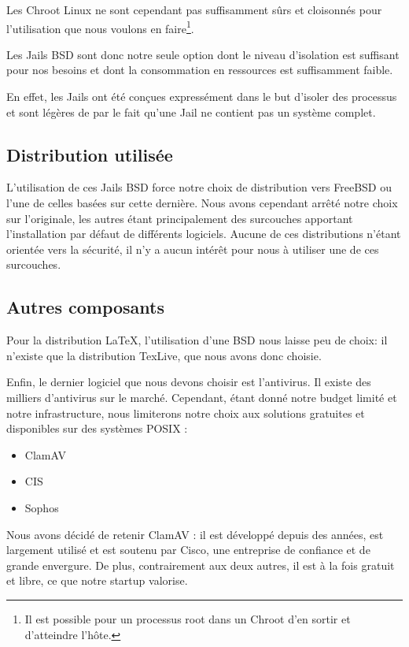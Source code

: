 \documentclass[10pt,a4paper]{article}
\begin{document}
Les Chroot Linux ne sont cependant pas suffisamment sûrs et cloisonnés pour l'utilisation que nous voulons en faire\footnote{Il est possible pour un processus root dans un Chroot d'en sortir et d'atteindre l'hôte.}.

Les Jails BSD sont donc notre seule option dont le niveau d'isolation est suffisant pour nos besoins et dont la consommation en ressources est suffisamment faible.

En effet, les Jails ont été conçues expressément dans le but d'isoler des processus et sont légères de par le fait qu'une Jail ne contient pas un système complet.

\subsection{Distribution utilisée}

L'utilisation de ces Jails BSD force notre choix de distribution vers FreeBSD ou l'une de celles basées sur cette dernière. Nous avons cependant arrêté notre choix sur l'originale, les autres étant principalement des surcouches apportant l'installation par défaut de différents logiciels. Aucune de ces distributions n'étant orientée vers la sécurité, il n'y a aucun intérêt pour nous à utiliser une de ces surcouches.

\subsection{Autres composants}

Pour la distribution \LaTeX, l'utilisation d'une BSD nous laisse peu de choix: il n'existe que la distribution TexLive, que nous avons donc choisie.

Enfin, le dernier logiciel que nous devons choisir est l'antivirus. Il existe des milliers d'antivirus sur le marché. Cependant, étant donné notre budget limité et notre infrastructure, nous limiterons notre choix aux solutions gratuites et disponibles sur des systèmes POSIX :
\begin{itemize}
    \item{ClamAV}
    \item{CIS}
    \item{Sophos}
\end{itemize}

Nous avons décidé de retenir ClamAV : il est développé depuis des années, est largement utilisé et est soutenu par Cisco, une entreprise de confiance et de grande envergure. De plus, contrairement aux deux autres, il est à la fois gratuit et libre, ce que notre startup valorise.
\end{document}
